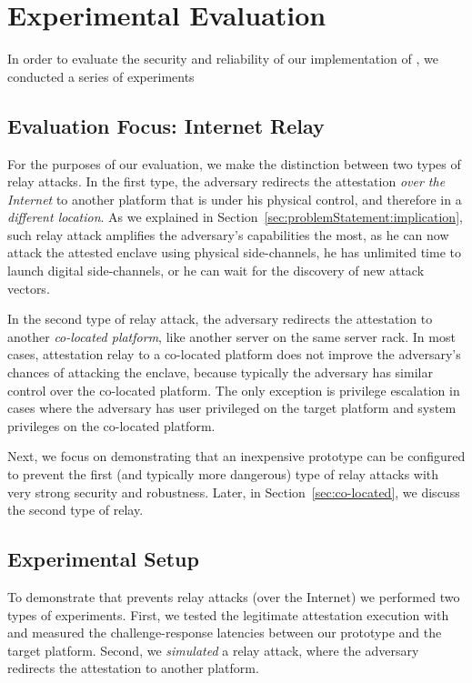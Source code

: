 \section{Experimental Evaluation}
\label{sec:evaluation}

In order to evaluate the security and reliability of our implementation of \name, we conducted a series of experiments

\subsection{Evaluation Focus: Internet Relay}
\label{sec:evaluation:focus}

For the purposes of our evaluation, we make the distinction between two types of relay attacks. In the first type, the adversary redirects the attestation \emph{over the Internet} to another platform that is under his physical control, and therefore in a \emph{different location}. As we explained in Section~\ref{sec:problemStatement:implication}, such relay attack amplifies the adversary's capabilities the most, as he can now attack the attested enclave using physical side-channels, he has unlimited time to launch digital side-channels, or he can wait for the discovery of new attack vectors. 
 
In the second type of relay attack, the adversary redirects the attestation to another \emph{co-located platform}, like another server on the same server rack. In most cases, attestation relay to a co-located platform does not improve the adversary's chances of attacking the enclave, because typically the adversary has similar control over the co-located platform. The only exception is privilege escalation in cases where the adversary has user privileged on the target platform and system privileges on the co-located platform. 

Next, we focus on demonstrating that an inexpensive \name prototype can be configured to prevent the first (and typically more dangerous) type of relay attacks with very strong security and robustness. Later, in Section~\ref{sec:co-located}, we discuss the second type of relay.


\subsection{Experimental Setup}
\label{sec:evaluation:exp}

To demonstrate that \name prevents relay attacks (over the Internet) we performed two types of experiments. First, we tested the legitimate attestation execution with \name and measured the challenge-response latencies between our prototype and the target platform. Second, we \emph{simulated} a relay attack, where the adversary redirects the attestation to another platform.

